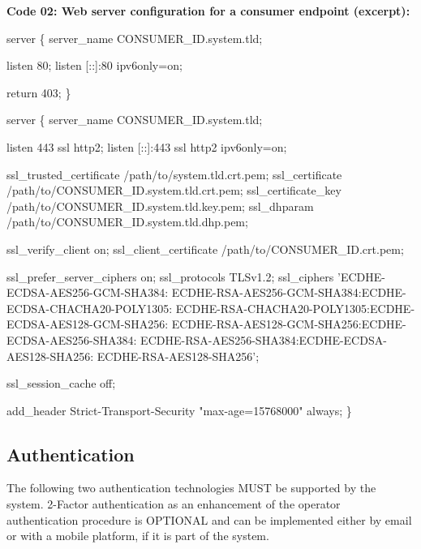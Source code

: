 \documentclass[12pt,english,a4paper,titlepage,cleardoublepage=empty,dottedtoc]{report}
\newenvironment{Shaded}{\begin{snugshade}}{\end{snugshade}}
\newcommand{\NormalTok}[1]{#1}
\begin{document}
\newpage

\textbf{\protect\hypertarget{spec_code-01_nginx-config-consumer-endpoint}{}{Code
02: Web server configuration for a consumer endpoint (excerpt)}:}

\begin{Shaded}
\begin{Highlighting}[numbers=left,,]
\NormalTok{server \{}
\NormalTok{    server_name CONSUMER_ID.system.tld;}
    
\NormalTok{    listen 80;}
\NormalTok{    listen [::]:80 ipv6only=on;}
    
\NormalTok{    return 403;}
\NormalTok{\}}

\NormalTok{server \{}
\NormalTok{    server_name CONSUMER_ID.system.tld;}
    
\NormalTok{    listen 443 ssl http2;}
\NormalTok{    listen [::]:443 ssl http2 ipv6only=on;}
    
\NormalTok{    ssl_trusted_certificate /path/to/system.tld.crt.pem;}
\NormalTok{    ssl_certificate         /path/to/CONSUMER_ID.system.tld.crt.pem;}
\NormalTok{    ssl_certificate_key     /path/to/CONSUMER_ID.system.tld.key.pem;}
\NormalTok{    ssl_dhparam             /path/to/CONSUMER_ID.system.tld.dhp.pem;}
    
\NormalTok{    ssl_verify_client on;}
\NormalTok{    ssl_client_certificate  /path/to/CONSUMER_ID.crt.pem;}
    
\NormalTok{    ssl_prefer_server_ciphers on;}
\NormalTok{    ssl_protocols TLSv1.2;}
\NormalTok{    ssl_ciphers 'ECDHE-ECDSA-AES256-GCM-SHA384:}
\NormalTok{        ECDHE-RSA-AES256-GCM-SHA384:ECDHE-ECDSA-CHACHA20-POLY1305:}
\NormalTok{        ECDHE-RSA-CHACHA20-POLY1305:ECDHE-ECDSA-AES128-GCM-SHA256:}
\NormalTok{        ECDHE-RSA-AES128-GCM-SHA256:ECDHE-ECDSA-AES256-SHA384:}
\NormalTok{        ECDHE-RSA-AES256-SHA384:ECDHE-ECDSA-AES128-SHA256:}
\NormalTok{        ECDHE-RSA-AES128-SHA256';}
    
\NormalTok{    ssl_session_cache off;}
    
\NormalTok{    add_header Strict-Transport-Security "max-age=15768000" always;}
\NormalTok{\}}
\end{Highlighting}
\end{Shaded}

\subsection{Authentication}\label{authentication-1}

The following two authentication technologies MUST be supported by the
system. 2-Factor authentication as an enhancement of the operator
authentication procedure is OPTIONAL and can be implemented either by
email or with a mobile platform, if it is part of the system.
\end{document}
